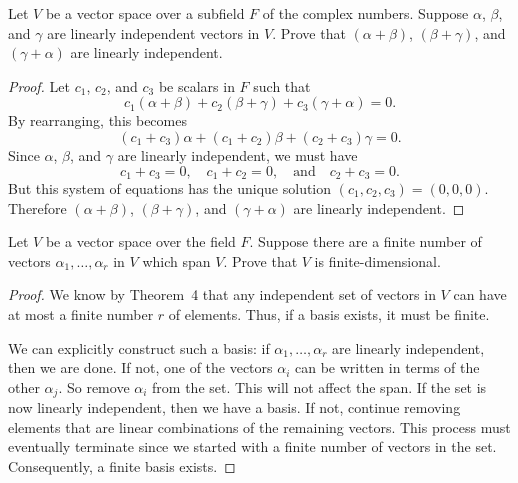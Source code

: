  Let $V$ be a vector space over a subfield $F$ of the
complex numbers. Suppose $\alpha$, $\beta$, and $\gamma$ are linearly
independent vectors in $V$. Prove that $(\alpha + \beta)$,
$(\beta + \gamma)$, and $(\gamma + \alpha)$ are linearly independent.
\begin{proof}
  Let $c_1$, $c_2$, and $c_3$ be scalars in $F$ such that
  \begin{equation*}
    c_1(\alpha + \beta) + c_2(\beta + \gamma) + c_3(\gamma + \alpha) = 0.
  \end{equation*}
  By rearranging, this becomes
  \begin{equation*}
    (c_1 + c_3)\alpha + (c_1 + c_2)\beta + (c_2 + c_3)\gamma = 0.
  \end{equation*}
  Since $\alpha$, $\beta$, and $\gamma$ are linearly independent, we
  must have
  \begin{equation*}
    c_1 + c_3 = 0, \quad c_1 + c_2 = 0,
    \quad\text{and}\quad c_2 + c_3 = 0.
  \end{equation*}
  But this system of equations has the unique solution
  $(c_1,c_2,c_3) = (0, 0, 0)$. Therefore $(\alpha + \beta)$,
  $(\beta + \gamma)$, and $(\gamma + \alpha)$ are linearly
  independent.
\end{proof}

 Let $V$ be a vector space over the field $F$. Suppose
there are a finite number of vectors $\alpha_1, \dots, \alpha_r$ in
$V$ which span $V$. Prove that $V$ is finite-dimensional.
\begin{proof}
  We know by Theorem~4 that any independent set of vectors in $V$ can
  have at most a finite number $r$ of elements. Thus, if a basis
  exists, it must be finite.

  We can explicitly construct such a basis: if
  $\alpha_1,\dots,\alpha_r$ are linearly independent, then we are
  done. If not, one of the vectors $\alpha_i$ can be written in terms
  of the other $\alpha_j$. So remove $\alpha_i$ from the set. This
  will not affect the span. If the set is now linearly independent,
  then we have a basis. If not, continue removing elements that are
  linear combinations of the remaining vectors. This process must
  eventually terminate since we started with a finite number of
  vectors in the set. Consequently, a finite basis exists.
\end{proof}

